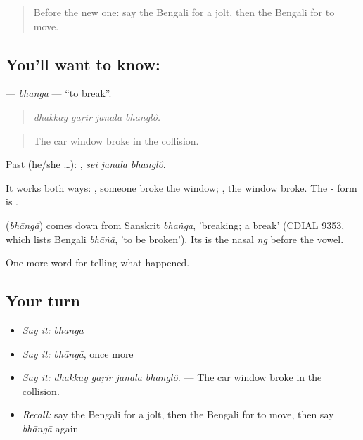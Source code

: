 \label{lesson:BN-C278-bhanga}



\begin{quote}
Before the new one: say the Bengali for a jolt, then the Bengali for to move.
\end{quote}

\subsection*{You'll want to know: }
\textbf{} — \emph{bhāngā} — \textquotedblleft{}to break\textquotedblright{}.

\begin{quote}
   
\end{quote}

\begin{quote}
\emph{dhākkāy gāṛir jānālā bhānglô.}
\end{quote}

\begin{quote}
The car window broke in the collision.
\end{quote}

Past (he/she …):   , \emph{sei jānālā bhānglô}.

It works both ways:   , someone broke the window;  , the window broke. The - form is .

\begin{cousinweb}
\textbf{} (\emph{bhāngā}) comes down from Sanskrit \emph{bhaṅga}, 'breaking; a break' (CDIAL 9353, which lists Bengali \emph{bhāṅā}, 'to be broken'). Its  is the nasal \emph{ng} before the vowel.
\end{cousinweb}

\begin{grammarlens}[title={What you've built}]
One more word for telling what happened.
\end{grammarlens}

\subsection*{Your turn}
\begin{itemize}
\raggedright
  \item \emph{Say it:} \emph{bhāngā}
  \item \emph{Say it:} \emph{bhāngā}, once more
  \item \emph{Say it:} \emph{dhākkāy gāṛir jānālā bhānglô.} — The car window broke in the collision.
  \item \emph{Recall:} say the Bengali for a jolt, then the Bengali for to move, then say \emph{bhāngā} again
\end{itemize}

